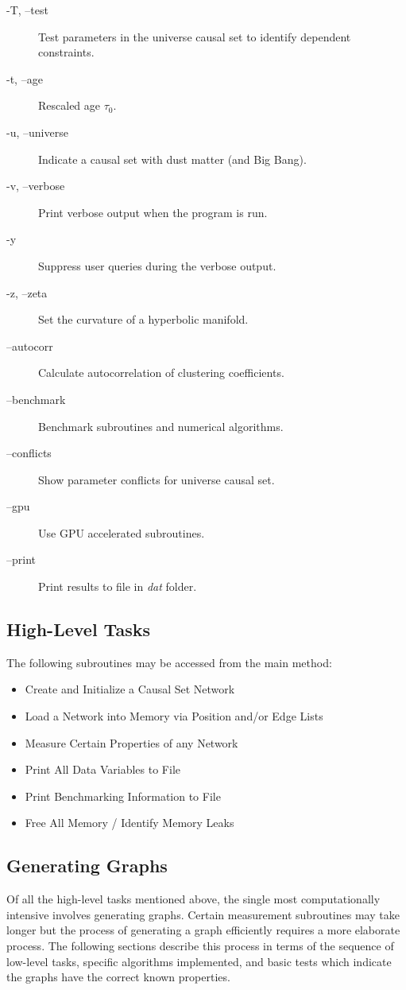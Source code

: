 \documentclass[preprint,notitlepage,amsmath,amssymb,floatfix]{revtex4-1}
\begin{document}
\begin{description}
  \item[-T, --test] \tab Test parameters in the universe causal set to identify dependent constraints.
  \item[-t, --age] \tab Rescaled age $\tau_0$.
  \item[-u, --universe] \tab Indicate a causal set with dust matter (and Big Bang).
  \item[-v, --verbose] \tab Print verbose output when the program is run.
  \item[-y] \tab\tab Suppress user queries during the verbose output.
  \item[-z, --zeta] \tab Set the curvature of a hyperbolic manifold.
  \item[--autocorr] \tab Calculate autocorrelation of clustering coefficients.
  \item[--benchmark] \tab Benchmark subroutines and numerical algorithms.
  \item[--conflicts] \tab Show parameter conflicts for universe causal set.
  \item[--gpu] \tab Use GPU accelerated subroutines.
  \item[--print] \tab Print results to file in \textit{dat} folder.
\end{description}
\subsection{High-Level Tasks}
\noindent The following subroutines may be accessed from the main method:
\begin{itemize}
  \item Create and Initialize a Causal Set Network
  \item Load a Network into Memory via Position and/or Edge Lists
  \item Measure Certain Properties of any Network
  \item Print All Data Variables to File
  \item Print Benchmarking Information to File
  \item Free All Memory / Identify Memory Leaks
\end{itemize}
\subsection{Generating Graphs}
Of all the high-level tasks mentioned above, the single most computationally intensive involves generating graphs.  
Certain measurement subroutines may take longer but the process of generating a graph efficiently requires a more elaborate process.  
The following sections describe this process in terms of the sequence of low-level tasks, specific algorithms implemented, and basic tests which indicate the graphs have the correct known properties.
\end{document}
